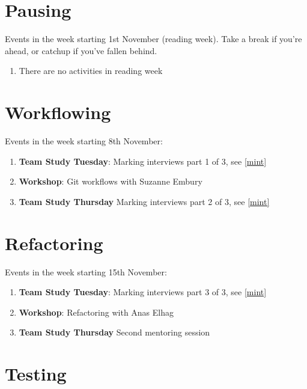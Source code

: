 \documentclass[
]{book}
\providecommand{\tightlist}{%
  \setlength{\itemsep}{0pt}\setlength{\parskip}{0pt}}
\begin{document}
\hypertarget{week6}{%
\section{Pausing}\label{week6}}

Events in the week starting 1st November (reading week). Take a break if you're ahead, or catchup if you've fallen behind.

\begin{enumerate}
\def\labelenumi{\arabic{enumi}.}
\tightlist
\item
  There are no activities in reading week
\end{enumerate}

\hypertarget{week7}{%
\section{Workflowing}\label{week7}}

Events in the week starting 8th November:

\begin{enumerate}
\def\labelenumi{\arabic{enumi}.}
\tightlist
\item
  \textbf{Team Study Tuesday}: Marking interviews part 1 of 3, see \ref{mint}
\item
  \textbf{Workshop}: Git workflows with Suzanne Embury
\item
  \textbf{Team Study Thursday} Marking interviews part 2 of 3, see \ref{mint}
\end{enumerate}

\hypertarget{week8}{%
\section{Refactoring}\label{week8}}

Events in the week starting 15th November:

\begin{enumerate}
\def\labelenumi{\arabic{enumi}.}
\tightlist
\item
  \textbf{Team Study Tuesday}: Marking interviews part 3 of 3, see \ref{mint}
\item
  \textbf{Workshop}: Refactoring with Anas Elhag
\item
  \textbf{Team Study Thursday} Second mentoring session
\end{enumerate}

\hypertarget{week9}{%
\section{Testing}\label{week9}}
\end{document}
